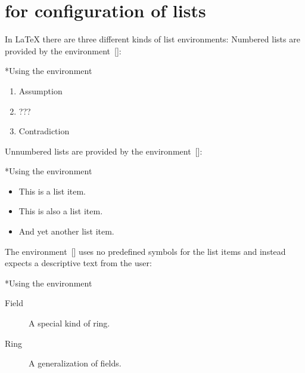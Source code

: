 \section{ for configuration of lists}

In {\LaTeX} there are three different kinds of list environments:
Numbered lists are provided by the environment~[\envname]:
\begin{showlatex}*{Using the environment~}
\begin{enumerate}
  \item
    Assumption
  \item
    ???
  \item
    Contradiction
\end{enumerate}
\end{showlatex}
Unnumbered lists are provided by the environment~[\envname]:
\begin{showlatex}*{Using the environment~}
\begin{itemize}
  \item
    This is a list item.
  \item
    This is also a list item.
  \item
    And yet another list item.
\end{itemize}
\end{showlatex}
The environment~[\envname] uses no predefined symbols for the list items and instead expects a descriptive text from the user:
\begin{showlatex}*{Using the environment~}
\begin{description}
  \item[Field]
    A special kind of ring.
  \item[Ring]
    A generalization of fields.
\end{description}
\end{showlatex}


